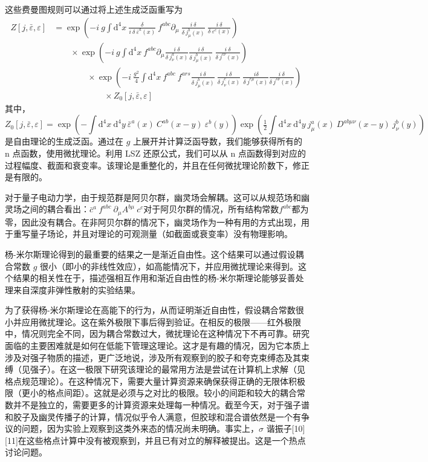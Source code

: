 这些费曼图规则可以通过将上述生成泛函重写为
\[\displaystyle {\begin{aligned}Z[j,{\bar {\varepsilon }},\varepsilon ]&=\exp \left(-i\ g\int \mathrm {d} ^{4}x\ {\frac {\delta }{i\ \delta \ {\bar {\varepsilon }}^{a}(x)}}\ f^{abc}\partial _{\mu }\ {\frac {i\ \delta }{\delta \ j_{\mu }^{b}(x)}}\ {\frac {i\ \delta }{\delta \ \varepsilon ^{c}(x)}}\right)\\&\qquad \times \exp \left(-i\ g\int \mathrm {d} ^{4}x\ f^{abc}\partial _{\mu }{\frac {i\ \delta }{\delta \ j_{\nu }^{a}(x)}}{\frac {i\ \delta }{\delta \ j_{\mu }^{b}(x)}}\ {\frac {i\ \delta }{\delta \ j^{c\nu }(x)}}\right)\\&\qquad \qquad \times \exp \left(-i\ {\frac {g^{2}}{4}}\int \mathrm {d} ^{4}x\ f^{abc}\ f^{ars}{\frac {i\ \delta }{\delta \ j_{\mu }^{b}(x)}}\ {\frac {i\ \delta }{\delta \ j_{\nu }^{c}(x)}}\ {\frac {\ i\delta }{\delta \ j^{r\mu }(x)}}{\frac {i\ \delta }{\delta \ j^{s\nu }(x)}}\right)\\&\qquad \qquad \qquad \times Z_{0}[j,{\bar {\varepsilon }},\varepsilon ]\end{aligned}}~\]
其中，
\[\displaystyle Z_{0}[j,{\bar {\varepsilon }},\varepsilon ]=\exp \left(-\int \mathrm {d} ^{4}x\ \mathrm {d} ^{4}y\ {\bar {\varepsilon }}^{a}(x)\ C^{ab}(x-y)\ \varepsilon ^{b}(y)\right)\exp \left({\tfrac {1}{2}}\int \mathrm {d} ^{4}x\ \mathrm {d} ^{4}y\ j_{\mu }^{a}(x)\ D^{ab\mu \nu }(x-y)\ j_{\nu }^{b}(y)\right)~\]
是自由理论的生成泛函。通过在 \(g\) 上展开并计算泛函导数，我们能够获得所有的 n 点函数，使用微扰理论。利用 LSZ 还原公式，我们可以从 n 点函数得到对应的过程幅度、截面和衰变率。该理论是重整化的，并且在任何微扰理论阶数下，修正是有限的。

对于量子电动力学，由于规范群是阿贝尔群，幽灵场会解耦。这可以从规范场和幽灵场之间的耦合看出：\(\displaystyle {\bar {c}}^{a}\ f^{abc}\ \partial _{\mu }A^{b\mu }\ c^{c}\)对于阿贝尔群的情况，所有结构常数\(\displaystyle f^{abc}\)都为零，因此没有耦合。在非阿贝尔群的情况下，幽灵场作为一种有用的方式出现，用于重写量子场论，并且对理论的可观测量（如截面或衰变率）没有物理影响。

杨-米尔斯理论得到的最重要的结果之一是渐近自由性。这个结果可以通过假设耦合常数 \(g\) 很小（即小的非线性效应），如高能情况下，并应用微扰理论来得到。这个结果的相关性在于，描述强相互作用和渐近自由性的杨-米尔斯理论能够妥善处理来自深度非弹性散射的实验结果。

为了获得杨-米尔斯理论在高能下的行为，从而证明渐近自由性，假设耦合常数很小并应用微扰理论。这在紫外极限下事后得到验证。在相反的极限——红外极限中，情况则完全不同，因为耦合常数过大，微扰理论在这种情况下不再可靠。研究面临的主要困难就是如何在低能下管理这理论。这才是有趣的情况，因为它本质上涉及对强子物质的描述，更广泛地说，涉及所有观察到的胶子和夸克束缚态及其束缚（见强子）。在这一极限下研究该理论的最常用方法是尝试在计算机上求解（见格点规范理论）。在这种情况下，需要大量计算资源来确保获得正确的无限体积极限（更小的格点间距）。这就是必须与之对比的极限。较小的间距和较大的耦合常数并不是独立的，需要更多的计算资源来处理每一种情况。截至今天，对于强子谱和胶子及幽灵传播子的计算，情况似乎令人满意，但胶球和混合谱依然是一个有争议的问题，因为实验上观察到这类外来态的情况尚未明确。事实上，\(\sigma\) 谐振子[10][11]在这些格点计算中没有被观察到，并且已有对立的解释被提出。这是一个热点讨论问题。
